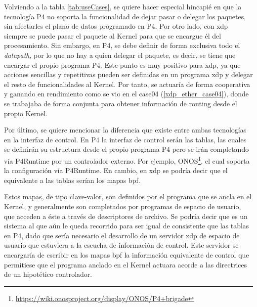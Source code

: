 

Volviendo a la tabla \ref{tab:useCases}, se quiere hacer especial hincapié en que la tecnología P4 no soporta la funcionalidad de dejar pasar o delegar los paquetes, sin afectarles el plano de datos programado en P4. Por otro lado, con \gls{xdp} siempre se puede pasar el paquete al Kernel para que se encargue él del procesamiento. Sin embargo, en P4, se debe definir de forma exclusiva todo el \textit{datapath}, por lo que no hay a quien delegar el paquete, es decir, se tiene que encargar el propio programa P4. Este punto es muy positivo para \gls{xdp}, ya que acciones sencillas y repetitivas pueden ser definidas en un programa \gls{xdp} y delegar el resto de funcionalidades al Kernel. Por tanto, se actuaría de forma cooperativa y ganando en rendimiento como se vio en el case04 (\ref{xdp_ether_case04}), donde se trabajaba de forma conjunta para obtener información de routing desde el propio Kernel. \\
\par
Por último, se quiere mencionar la diferencia que existe entre ambas tecnologías en la interfaz de control. En P4 la interfaz de control serán las tablas, las cuales se definirán su estructura desde el propio programa P4 pero se irán completando vía P4Runtime por un controlador externo. Por ejemplo, ONOS\footnote{\url{https://wiki.onosproject.org/display/ONOS/P4+brigade}}, el cual soporta la configuración vía P4Runtime. En cambio, en \gls{xdp} se podría decir que el equivalente a las tablas serían los mapas \gls{bpf}.\\
\par
Estos mapas, de tipo clave-valor, son definidos por el programa que se ancla en el Kernel, y generalmente son completados por programas de espacio de usuario, que acceden a éste a través de descriptores de archivo. Se podría decir que es un sistema al que aún le queda recorrido para ser igual de consistente que las tablas en P4, dado que sería necesario el desarrollo de un servidor \gls{xdp} de espacio de usuario que estuviera a la escucha de información de control. Este servidor se encargaría de escribir en los mapas \gls{bpf} la información equivalente de control que permitiese que el programa anclado en el Kernel actuara acorde a las directrices de un hipotético controlador.\\
\par

